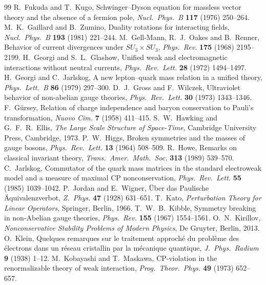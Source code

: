 \begin{thebibliography}{99}
 R.~Fukuda and T.~Kugo, Schwinger--Dyson equation for massless vector theory and the absence of a fermion pole, \emph{Nucl.\ Phys.\ B} \textbf{117} (1976) 250--264.
 M.~K.~Gaillard and B.~Zumino, Duality rotations for interacting fields, \emph{Nucl.\ Phys.\ B} \textbf{193} (1981) 221--244.
 M.~Gell-Mann, R.~J.~Oakes and B.~Renner, Behavior of current divergences under $SU_3\times SU_3$, \emph{Phys.\ Rev.} \textbf{175} (1968) 2195--2199.
 H.~Georgi and S.~L.~Glashow, Unified weak and electromagnetic interactions without neutral currents, \emph{Phys.\ Rev.\ Lett.} \textbf{28} (1972) 1494--1497.
 H.~Georgi and C.~Jarlskog, A new lepton--quark mass relation in a unified theory, \emph{Phys.\ Lett.\ B} \textbf{86} (1979) 297--300.
 D.~J.~Gross and F.~Wilczek, Ultraviolet behavior of non-abelian gauge theories, \emph{Phys.\ Rev.\ Lett.} \textbf{30} (1973) 1343--1346.
 F.~G\"ursey, Relation of charge independence and baryon conservation to Pauli's transformation, \emph{Nuovo Cim.} \textbf{7} (1958) 411--415.
 S.~W.~Hawking and G.~F.~R.~Ellis, \emph{The Large Scale Structure of Space-Time}, Cambridge University Press, Cambridge, 1973.
 P.~W.~Higgs, Broken symmetries and the masses of gauge bosons, \emph{Phys.\ Rev.\ Lett.} \textbf{13} (1964) 508--509.
 R.~Howe, Remarks on classical invariant theory, \emph{Trans.\ Amer.\ Math.\ Soc.} \textbf{313} (1989) 539--570.
 C.~Jarlskog, Commutator of the quark mass matrices in the standard electroweak model and a measure of maximal CP nonconservation, \emph{Phys.\ Rev.\ Lett.} \textbf{55} (1985) 1039--1042.
 P.~Jordan and E.~Wigner, \"Uber das Paulische \"Aquivalenzverbot, \emph{Z.\ Phys.} \textbf{47} (1928) 631--651.
 T.~Kato, \emph{Perturbation Theory for Linear Operators}, Springer, Berlin, 1966.
 T.~W.~B.~Kibble, Symmetry breaking in non-Abelian gauge theories, \emph{Phys.\ Rev.} \textbf{155} (1967) 1554--1561.
 O.~N.~Kirillov, \emph{Nonconservative Stability Problems of Modern Physics}, De Gruyter, Berlin, 2013.
 O.~Klein, Quelques remarques sur le traitement approch\'e du probl\`eme des \'electrons dans un r\'eseau cristallin par la m\'ecanique quantique, \emph{J.\ Phys.\ Radium} \textbf{9} (1938) 1--12.
 M.~Kobayashi and T.~Maskawa, CP-violation in the renormalizable theory of weak interaction, \emph{Prog.\ Theor.\ Phys.} \textbf{49} (1973) 652--657.

\end{thebibliography}
